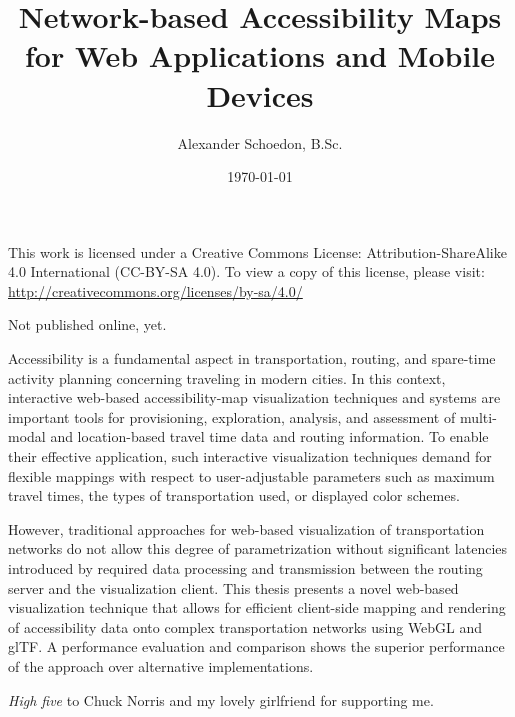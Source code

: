 \documentclass[english]{cgsthesis}
\title{
  \huge Network-based Accessibility Maps\\
  for Web Applications and Mobile Devices
}
\author{Alexander Schoedon, B.Sc.}
\date{\today}
\begin{document}
\frontmatter
\maketitle

\thispagestyle{plain}

{\noindent This work is licensed under a Creative Commons License:
Attribution-ShareAlike 4.0 International (CC-BY-SA 4.0). To view a copy of this
license, please visit:\\[1em]
\url{http://creativecommons.org/licenses/by-sa/4.0/}}

\vfill

{\noindent Not published online, yet.}


\cleardoublepage
{}
Accessibility is a fundamental aspect in transportation, routing, and spare-time
activity planning concerning traveling in modern cities. In this context,
interactive web-based accessibility-map visualization techniques and systems
are important tools for provisioning, exploration, analysis, and assessment of
multi-modal and location-based travel time data and routing information. To
enable their effective application, such interactive visualization techniques
demand for flexible mappings with respect to user-adjustable parameters such
as maximum travel times, the types of transportation used, or displayed color
schemes.\par
However, traditional approaches for web-based visualization of
transportation networks do not allow this degree of parametrization without
significant latencies introduced by required data processing and transmission
between the routing server and the visualization client. This thesis presents
a novel web-based visualization technique that allows for efficient client-side
mapping and rendering of accessibility data onto complex transportation
networks using WebGL and glTF. A performance evaluation and comparison shows
the superior performance of the approach over alternative implementations.



\newpage\thispagestyle{plain}
\vspace*{5em}
\textit{High five} to Chuck Norris and my lovely girlfriend for supporting me.
\end{document}
